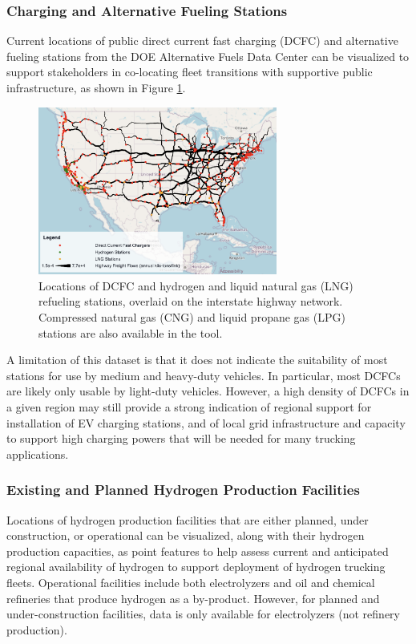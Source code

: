 \subsubsection{Charging and Alternative Fueling Stations}

Current locations of public direct current fast charging (DCFC) and alternative fueling stations from the DOE Alternative Fuels Data Center \cite{AFDC_2024} can be visualized to support stakeholders in co-locating fleet transitions with supportive public infrastructure, as shown in Figure \ref{fig:stations}.

\begin{figure}[ht]
        \centering
        \includegraphics[width=0.7\textwidth]{figures/stations.png}
        \caption{Locations of DCFC and hydrogen and liquid natural gas (LNG) refueling stations, overlaid on the interstate highway network. Compressed natural gas (CNG) and liquid propane gas (LPG) stations are also available in the tool.}
        \label{fig:stations}
\end{figure}

A limitation of this dataset is that it does not indicate the suitability of most stations for use by medium and heavy-duty vehicles. In particular, most DCFCs are likely only usable by light-duty vehicles. However, a high density of DCFCs in a given region may still provide a strong indication of regional support for installation of EV charging stations, and of local grid infrastructure and capacity to support high charging powers that will be needed for many trucking applications.  

\subsubsection{Existing and Planned Hydrogen Production Facilities}

Locations of hydrogen production facilities that are either planned, under construction, or operational can be visualized, along with their hydrogen production capacities, as point features to help assess current and anticipated regional availability of hydrogen to support deployment of hydrogen trucking fleets. Operational facilities include both electrolyzers and oil and chemical refineries that produce hydrogen as a by-product. However, for planned and under-construction facilities, data is only available for electrolyzers (not refinery production).


